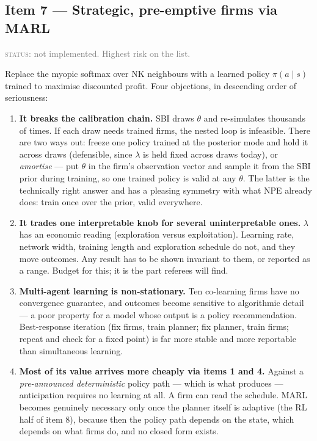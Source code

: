 \documentclass[11pt]{article}
\newcommand{\status}[1]{\textcolor{gray}{\textsc{status:} #1}}
\begin{document}
\subsection{Item 7 --- Strategic, pre-emptive firms via MARL}

\status{not implemented. Highest risk on the list.}

Replace the myopic softmax over NK neighbours with a learned policy
$\pi(a \mid s)$ trained to maximise discounted profit. Four objections, in
descending order of seriousness:

\begin{enumerate}[leftmargin=1.5em]
\item \textbf{It breaks the calibration chain.} SBI draws $\theta$ and
  re-simulates thousands of times. If each draw needs trained firms, the
  nested loop is infeasible. There are two ways out: freeze one policy
  trained at the posterior mode and hold it across draws (defensible, since
  $\lambda$ is held fixed across draws today), or \emph{amortise} --- put
  $\theta$ in the firm's observation vector and sample it from the SBI prior
  during training, so one trained policy is valid at any $\theta$. The
  latter is the technically right answer and has a pleasing symmetry with
  what NPE already does: train once over the prior, valid everywhere.
\item \textbf{It trades one interpretable knob for several
  uninterpretable ones.} $\lambda$ has an economic reading (exploration
  versus exploitation). Learning rate, network width, training length and
  exploration schedule do not, and they move outcomes. Any result has to
  be shown invariant to them, or reported as a range. Budget for this; it
  is the part referees will find.
\item \textbf{Multi-agent learning is non-stationary.} Ten co-learning
  firms have no convergence guarantee, and outcomes become sensitive to
  algorithmic detail --- a poor property for a model whose output is a
  policy recommendation. Best-response iteration (fix firms, train planner;
  fix planner, train firms; repeat and check for a fixed point) is far more
  stable and more reportable than simultaneous learning.
\item \textbf{Most of its value arrives more cheaply via items 1 and 4.}
  Against a \emph{pre-announced deterministic} policy path --- which is what
   produces --- anticipation requires no
  learning at all. A firm can read the schedule. MARL becomes genuinely
  necessary only once the planner itself is adaptive (the RL half of
  item 8), because then the policy path depends on the state, which depends
  on what firms do, and no closed form exists.
\end{enumerate}
\end{document}
